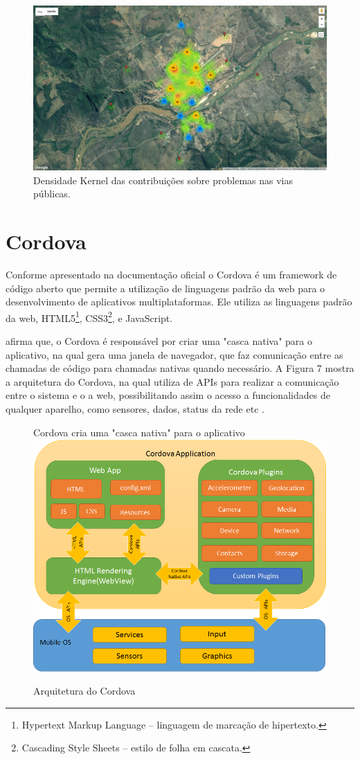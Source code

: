 \begin{figure}[H]
	\centering
	\caption{Densidade Kernel das contribuições sobre problemas nas vias públicas.}	
	\includegraphics[width=0.6\linewidth]{Imagens/04}
\end{figure}

\section{Cordova}
Conforme apresentado na documentação oficial  o Cordova é um framework de código aberto que permite a utilização de linguagens padrão da web para o desenvolvimento de aplicativos multiplataformas. Ele utiliza as linguagens padrão da web, HTML5\footnote{Hypertext Markup Language – linguagem de marcação de hipertexto.}, CSS3\footnote{Cascading Style Sheets – estilo de folha em cascata.}, e JavaScript.

 afirma que, o Cordova é responsável por criar uma "casca nativa" para o aplicativo, na qual gera uma janela de navegador, que faz comunicação entre as chamadas de código para chamadas nativas quando necessário. A Figura 7 mostra a arquitetura do Cordova, na qual utiliza de APIs para realizar a comunicação entre o sistema e o a web, possibilitando assim o acesso a funcionalidades de qualquer aparelho, como sensores, dados, status da rede etc . 

\begin{figure}[H]
	\centering
	\caption{Arquitetura do Cordova}	Cordova cria uma "casca nativa" para o aplicativo 
	\includegraphics[width=0.6\linewidth]{Imagens/cordovaapparchitecture.png}
\end{figure}

